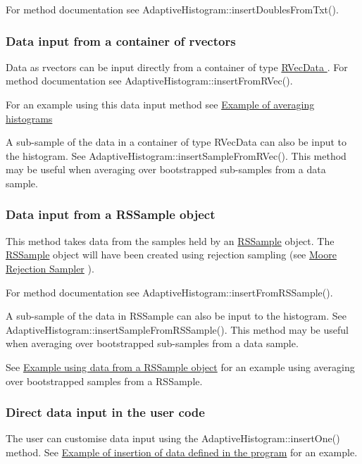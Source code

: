 \-For method documentation see \-Adaptive\-Histogram\-::insert\-Doubles\-From\-Txt().\hypertarget{AdaptiveHistograms_adhsubsec_rvecinput}{}\subsubsection{\-Data input from a container of rvectors}\label{AdaptiveHistograms_adhsubsec_rvecinput}
\-Data as rvectors can be input directly from a container of type \hyperlink{namespacesubpavings_a30e15e24c8d81a2160d7422ef3c39d68}{\-R\-Vec\-Data }. \-For method documentation see \-Adaptive\-Histogram\-::insert\-From\-R\-Vec().

\-For an example using this data input method see \hyperlink{AdaptiveHistograms_adhsubsec_examaveraging}{\-Example of averaging histograms}

\-A sub-\/sample of the data in a container of type \-R\-Vec\-Data can also be input to the histogram. \-See \-Adaptive\-Histogram\-::insert\-Sample\-From\-R\-Vec(). \-This method may be useful when averaging over bootstrapped sub-\/samples from a data sample.\hypertarget{AdaptiveHistograms_adhsubsec_rssampleinput}{}\subsubsection{\-Data input from a R\-S\-Sample object}\label{AdaptiveHistograms_adhsubsec_rssampleinput}
\-This method takes data from the samples held by an \hyperlink{classRSSample}{\-R\-S\-Sample} object. \-The \hyperlink{classRSSample}{\-R\-S\-Sample} object will have been created using rejection sampling (see \hyperlink{moorerejsam}{\-Moore \-Rejection \-Sampler} ).

\-For method documentation see \-Adaptive\-Histogram\-::insert\-From\-R\-S\-Sample().

\-A sub-\/sample of the data in \-R\-S\-Sample can also be input to the histogram. \-See \-Adaptive\-Histogram\-::insert\-Sample\-From\-R\-S\-Sample(). \-This method may be useful when averaging over bootstrapped sub-\/samples from a data sample.

\-See \hyperlink{AdaptiveHistograms_adhsubsec_examLevy}{\-Example using data from a \-R\-S\-Sample object} for an example using averaging over bootstrapped samples from a \-R\-S\-Sample.\hypertarget{AdaptiveHistograms_adhsubsec_directinput}{}\subsubsection{\-Direct data input in the user code}\label{AdaptiveHistograms_adhsubsec_directinput}
\-The user can customise data input using the \-Adaptive\-Histogram\-::insert\-One() method. \-See \hyperlink{AdaptiveHistograms_adhsubsec_exambyhand}{\-Example of insertion of data defined in the program} for an example.



